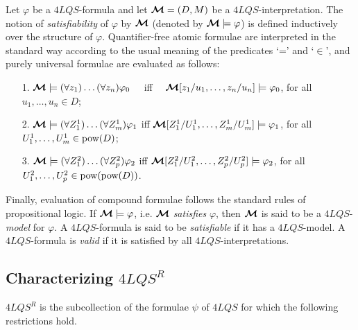 \documentclass{fundam}
\newcommand{\model}{\ensuremath{\mbox{\boldmath $\mathcal{M}$}}\xspace}
\newcommand{\pow}{\mbox{\rm pow}}
\newcommand{\QLQSR}{\ensuremath{\mbox{$4\mathit{LQS}^{R}$}}\xspace}
\newcommand{\QLQS}{\ensuremath{\mbox{$4\mathit{LQS}$}}\xspace}
\begin{document}
Let $\varphi$ be a $\QLQS$-formula and let $\model = (D, M)$ be a
$\QLQS$-interpre\-ta\-tion.  The notion of {\em satisfiability} of
$\varphi$ by $\model$ (denoted by $\model \models
\varphi$) is defined inductively over the structure of $\varphi$.
Quantifier-free atomic formulae are interpreted in the standard way
according to the usual meaning of the predicates `=' and `$\in$', and
purely universal formulae are evaluated as follows:
\begin{itemize}
\item[1.] $\model \models (\forall z_1) \ldots (\forall z_n) \varphi_0$
~~iff~~ $\model[z_1/u_1,\ldots , z_n/u_n] \models \varphi_0$, for
all $u_1,\ldots ,u_n \in D$;
\item[2.]  $\model \models (\forall Z_{1}^{1}) \ldots (\forall Z_{m}^{1})
\varphi_1$ iff $\model[Z_{1}^{1}/U_{1}^{1},\ldots , Z_{m}^{1}/U_{m}^{1}] \models
\varphi_1$, for all $U_{1}^{1},\ldots , U_{m}^{1} \in \pow(D)$;
\item[3.]  $\model \models (\forall Z_{1}^{2}) \ldots (\forall Z_{p}^{2})
\varphi_2$ iff $\model[Z_{1}^{2}/U_{1}^{2},\ldots , Z_{p}^{2}/U_{p}^{2}] \models
\varphi_2$, for all $U_{1}^{2},\ldots , U_{p}^{2} \in \pow(\pow(D))$.
\end{itemize}
Finally, evaluation of compound formulae follows the standard
rules of propositional logic.  If $\model \models \varphi$, i.e. $\model$
{\em satisfies\/} $\varphi$, then $\model$ is said to be a $\QLQS$-{\em
model\/} for $\varphi$.  A $\QLQS$-formula is said to be {\em
satisfiable\/} if it has a $\QLQS$-model.  A $\QLQS$-formula is
\emph{valid} if it is satisfied by all $\QLQS$-interpretations.


\subsection{Characterizing $\QLQSR$}\label{restrictionquant}
$\QLQSR$ is the subcollection of the formulae $\psi$ of $\QLQS$ for which the following restrictions hold.
\end{document}
